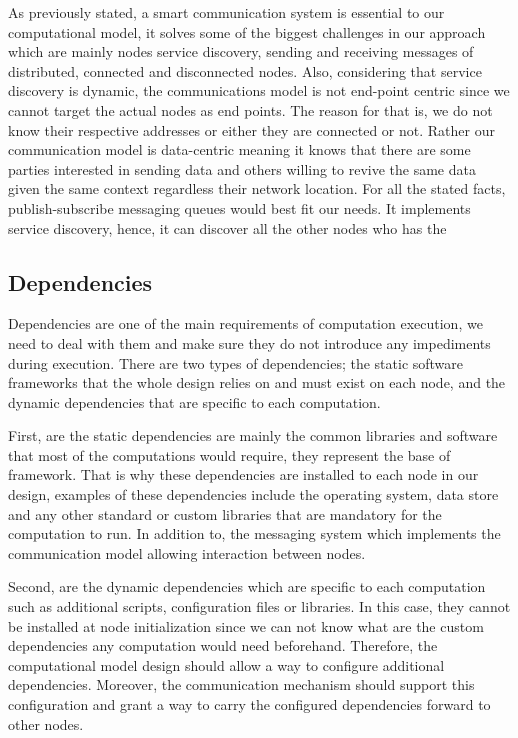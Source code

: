 As previously stated, a smart communication system is essential to our computational model, it solves some of the biggest challenges in our approach which are mainly nodes service discovery, sending and receiving messages of distributed, connected and disconnected nodes. Also, considering that service discovery is dynamic, the communications model is not end-point centric since we cannot target the actual nodes as end points. The reason for that is, we do not know their respective addresses or either they are connected or not. Rather our communication model is data-centric meaning it knows that there are some parties interested in sending data and others willing to revive the same data given the same context regardless their network location.
For all the stated facts, publish-subscribe messaging queues would best fit our needs. It implements service discovery, hence, it can discover all the other nodes who has the 



\newpage


\subsection{Dependencies}

Dependencies are one of the main requirements of computation execution, we need to deal with them and make sure they do not introduce any impediments during execution. There are two types of dependencies; the static software frameworks that the whole design relies on and must exist on each node, and the dynamic dependencies that are specific to each computation.

First, are the static dependencies are mainly the common libraries and software that most of the computations would require, they represent the base of framework. That is why these dependencies are installed to each node in our design, examples of these dependencies include the operating system, data store and any other standard or custom libraries that are mandatory for the computation to run. In addition to, the messaging system which implements the communication model allowing interaction between nodes. 

 Second, are the dynamic dependencies which are specific to each computation such as additional scripts, configuration files or libraries. In this case, they cannot be installed at node initialization since we can not know what are the custom dependencies any computation would need beforehand. Therefore, the computational model design should allow a way to configure additional dependencies. Moreover, the communication mechanism should support this configuration and grant a way to carry the configured dependencies forward to other nodes.
 
